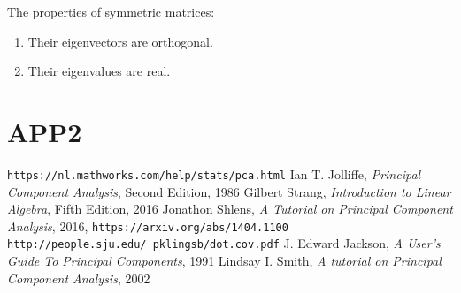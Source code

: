\documentclass[10pt,twocolumn]{article}
\begin{document}
The properties of symmetric matrices:

\begin{enumerate}
\item Their eigenvectors are orthogonal.
\item Their eigenvalues are real.
\end{enumerate}



\section{APP2} \label{app:B}

\thebibliography{}

 \texttt{https://nl.mathworks.com/help/stats/pca.html}
 Ian T. Jolliffe, \textit{Principal Component Analysis}, Second Edition, 1986
 Gilbert Strang, \textit{Introduction to Linear Algebra}, Fifth Edition, 2016
 Jonathon Shlens, \textit{A Tutorial on Principal Component Analysis}, 2016, \texttt{https://arxiv.org/abs/1404.1100}
 \texttt{http://people.sju.edu/~pklingsb/dot.cov.pdf}
 J. Edward Jackson, \textit{A User's Guide To Principal Components}, 1991
 Lindsay I. Smith, \textit{A tutorial on Principal Component Analysis}, 2002
\end{document}
